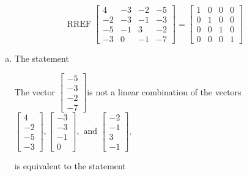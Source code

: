 \begin{exerciseAnswer} 
\[\operatorname{RREF}  \left[\begin{array}{ccc|c}
4 & -3 & -2 & -5 \\
-2 & -3 & -1 & -3 \\
-5 & -1 & 3 & -2 \\
-3 & 0 & -1 & -7
\end{array}\right] = \left[\begin{array}{ccc|c}
1 & 0 & 0 & 0 \\
0 & 1 & 0 & 0 \\
0 & 0 & 1 & 0 \\
0 & 0 & 0 & 1
\end{array}\right] \]
\begin{enumerate}[(a)]
\item  The statement 
\begin{center}\begin{minipage}{0.8\textwidth}
 The vector \( \left[\begin{array}{c}
-5 \\
-3 \\
-2 \\
-7
\end{array}\right] \)is not a linear combination of the vectors \( \left[\begin{array}{c}
4 \\
-2 \\
-5 \\
-3
\end{array}\right] , \left[\begin{array}{c}
-3 \\
-3 \\
-1 \\
0
\end{array}\right] , \text{ and } \left[\begin{array}{c}
-2 \\
-1 \\
3 \\
-1
\end{array}\right] \). 
\end{minipage}\end{center}
     is equivalent to the statement 
\begin{center}\begin{minipage}{0.8\textwidth}
 The vector equation \( x_{1} \left[\begin{array}{c}
4 \\
-2 \\
-5 \\

\end{array}
\end{minipage}
\end{center}
\end{enumerate}
\end{exerciseAnswer}
